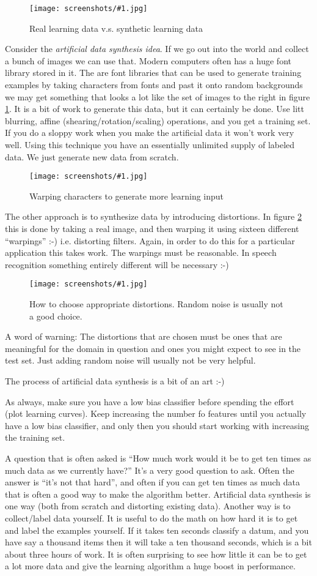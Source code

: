 \documentclass[a4, 12pt, english, USenglish]{scrreprt}
\newcommand{\screenshot}[2]{
\begin{figure}[htb]
\texttt{[image: screenshots/\#1.jpg]}
\label{#1}
\caption{#2}
\end{figure}}
\newcommand{\idx}[1]{{\em #1}\index{#1}}
\begin{document}
\screenshot{artificialsyntheticdata}{Real learning data v.s. synthetic
learning data}

Consider the \idx{artificial data synthesis idea}.  If we go out into
the world and collect a bunch of images we can use that.   Modern
computers often has a huge font library stored in it.  The are font
libraries that can be used to generate training examples by taking
characters from fonts and past it onto random backgrounds we may get
something that looks a lot like the set of images to the right in
figure \ref{artificialsyntheticdata}.  It is a bit of work to generate
this data, but it can certainly be done.  Use litt blurring, affine
(shearing/rotation/scaling) operations, and you get a training set.
If you do a sloppy work when you make the artificial data it won't
work very well.   Using this technique you have an essentially
unlimited supply of labeled data.  We just generate new data from
scratch.


\screenshot{warpedcharacters}{Warping characters to generate more
  learning input}

The other  approach is to synthesize data by introducing
distortions. In figure \ref{warpedcharacters} this is done by taking a
real image, and then warping it using sixteen different ``warpings''
:-) i.e. distorting filters.  Again, in order to do this for a
particular application this takes work.  The warpings must be
reasonable.  In speech recognition something entirely different will
be necessary :-)

\screenshot{choosingdistortions}{How to choose appropriate
  distortions.  Random noise is usually not a good choice.}

A word of warning: The distortions that are chosen must be ones that
are meaningful for the domain in question and ones you might expect to
see in the test set. Just adding random noise will usually not be very
helpful.

The process of artificial data synthesis is a bit of an art :-)

As always, make sure you have a low bias classifier before spending
the effort (plot learning curves).  Keep increasing the number fo
features until  you actually have a low bias classifier, and only then
you should start working with increasing the training set.

A question that is often asked is ``How much work would it be to get
ten times as much data as we currently have?'' It's a very good
question to ask.  Often the answer is ``it's not that hard'', and
often if you can get ten times as much data that is often a good way
to make the algorithm better.  Artificial data synthesis is one way
(both from scratch and distorting existing data).  Another way is to
collect/label data yourself.  It is useful to do the math on how hard
it is to get and label the examples yourself.  If it takes ten seconds
classify a datum, and you have say a thousand items then it will take
a ten thousand seconds, which is a bit about three hours of work.  It
is often surprising to see how little it can be to get a lot more data
and give the learning algorithm a huge boost in performance.
\end{document}
